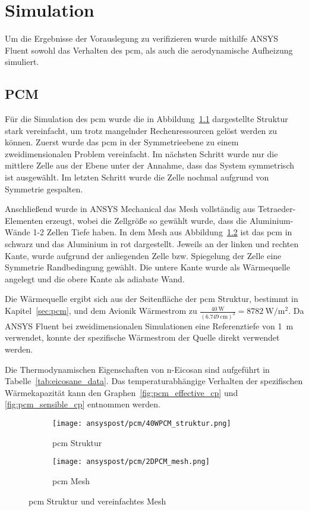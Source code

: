 \chapter{Simulation}\label{chap:Simulation}

Um die Ergebnisse der Vorauslegung zu verifizieren wurde mithilfe ANSYS Fluent sowohl das Verhalten des \ac{pcm}, als auch die
aerodynamische Aufheizung simuliert.

\section{PCM}\label{sec:sim_pcm}

Für die Simulation des \ac{pcm} wurde die in Abbildung~\ref{fig:pcm_struktur} dargestellte Struktur stark vereinfacht,
um trotz mangelnder Rechenressourcen gelöst werden zu können. Zuerst wurde das \ac{pcm} in der Symmetrieebene
zu einem zweidimensionalen Problem vereinfacht. Im nächsten Schritt wurde nur die mittlere Zelle aus der Ebene unter der Annahme,
dass das System symmetrisch ist ausgewählt. Im letzten Schritt wurde die Zelle nochmal aufgrund von Symmetrie gespalten.

Anschließend wurde in ANSYS Mechanical das Mesh vollständig aus Tetraeder-Elementen erzeugt, wobei die Zellgröße so gewählt
wurde, dass die Aluminium-Wände 1-2 Zellen Tiefe haben. In dem Mesh aus Abbildung~\ref{fig:pcm_mesh} ist das \ac{pcm} in schwarz und das Aluminium
in rot dargestellt. Jeweils an der linken und rechten Kante, wurde aufgrund der anliegenden Zelle bzw. Spiegelung der Zelle eine
Symmetrie Randbedingung gewählt. Die untere Kante wurde als Wärmequelle angelegt und die obere Kante als adiabate Wand.

Die Wärmequelle ergibt sich aus der Seitenfläche der \ac{pcm} Struktur, bestimmt in Kapitel~\ref{sec:pcm}, und dem Avionik Wärmestrom zu
$\frac{\SI{40}{\watt}}{\left(\SI{6,749}{\centi\meter}\right)^2} = \SI{8782}{\watt\per\meter\squared}$.
Da ANSYS Fluent bei zweidimensionalen Simulationen eine Referenztiefe von \SI{1}{m} verwendet, konnte der spezifische Wärmestrom
der Quelle direkt verwendet werden.

Die Thermodynamischen Eigenschaften von n-Eicosan sind aufgeführt in Tabelle~\ref{tab:eicosane_data}.
Das temperaturabhängige Verhalten der spezifischen Wärmekapazität kann den Graphen~\ref{fig:pcm_effective_cp} und \ref{fig:pcm_sensible_cp}
entnommen werden.

\begin{figure}[!htb]
    \centering
    \begin{subfigure}[t]{0.7\textwidth}
        \centering
        \texttt{[image: ansyspost/pcm/40WPCM\_struktur.png]}
        \caption{\ac{pcm} Struktur}\label{fig:pcm_struktur}
    \end{subfigure}
    \hfill
    \begin{subfigure}[t]{0.15\textwidth}
        \centering
        \texttt{[image: ansyspost/pcm/2DPCM\_mesh.png]}
        \caption{\ac{pcm} Mesh}\label{fig:pcm_mesh}
    \end{subfigure}
    \caption{\ac{pcm} Struktur und vereinfachtes Mesh}\label{fig:pcm_geometrien}
\end{figure}

